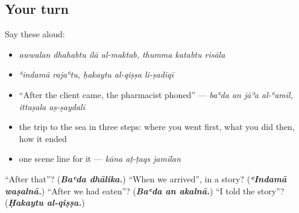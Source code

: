 \subsection*{Your turn}
Say these aloud:

\begin{itemize}
\raggedright
  \item \emph{awwalan dhahabtu ilā al-maktab, thumma katabtu risāla}
  \item \emph{ʿindamā rajaʿtu, ḥakaytu al-qiṣṣa li-ṣadīqī}
  \item \textquotedblleft{}After the client came, the pharmacist phoned\textquotedblright{} — \emph{baʿda an jāʾa al-ʿamīl, ittaṣala aṣ-ṣaydalī}
  \item the trip to the sea in three steps: where you went first, what you did then, how it ended
  \item one scene line for it — \emph{kāna aṭ-ṭaqs jamīlan}
\end{itemize}

\begin{tcolorbox}[breakable,colback=teal!4,colframe=teal!35!black,title={Before you move on}]
\textquotedblleft{}After that\textquotedblright{}? (\emph{\textbf{Baʿda dhālika.}}) \textquotedblleft{}When we arrived\textquotedblright{}, in a story? (\emph{\textbf{ʿIndamā waṣalnā.}}) \textquotedblleft{}After we had eaten\textquotedblright{}? (\emph{\textbf{Baʿda an akalnā.}}) \textquotedblleft{}I told the story\textquotedblright{}? (\emph{\textbf{Ḥakaytu al-qiṣṣa.}})
\end{tcolorbox}
